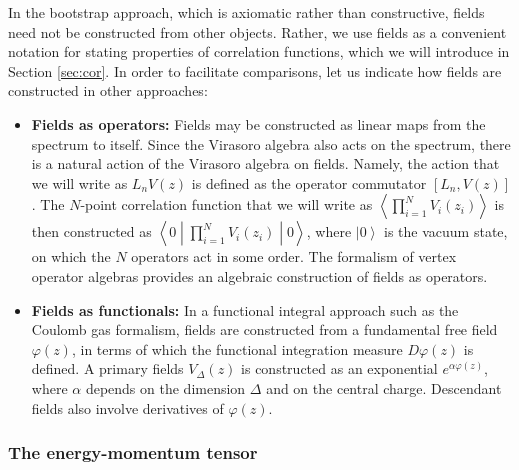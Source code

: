 \documentclass[12pt, a4paper]{article}
\begin{document}
In the bootstrap approach, which is axiomatic rather than constructive, fields need not be constructed from other objects. Rather, we use fields as a convenient notation for stating properties of correlation functions, which we will introduce in Section \ref{sec:cor}. In order to facilitate comparisons, let us indicate how fields are constructed in other approaches:
\begin{itemize}
 \item \textbf{Fields as operators:} Fields may be constructed as linear maps from the spectrum to itself. Since the Virasoro algebra also acts on the spectrum, there is a natural action of the Virasoro algebra on fields. Namely, the action that we will write as $L_nV(z)$ is defined as the operator commutator $[L_n,V(z)]$. The $N$-point correlation function that we will write as $\left<\prod_{i=1}^N V_i(z_i)\right>$ is then constructed as $\left<0\middle| \prod_{i=1}^N V_i(z_i)\middle|0\right>$, where $\left|0\right>$ is the vacuum state, on which the $N$ operators act in some order. The formalism of vertex operator algebras provides an algebraic construction of fields as operators.
 \item \textbf{Fields as functionals:} In a functional integral approach such as the Coulomb gas formalism, fields are constructed from a fundamental free field $\varphi(z)$, in terms of which the functional integration measure $D\varphi(z)$ is defined. A primary fields $V_\Delta(z)$ is constructed as an exponential $e^{\alpha\varphi(z)}$, where $\alpha$ depends on the dimension $\Delta$ and on the central charge. Descendant fields also involve derivatives of $\varphi(z)$.
\end{itemize}



\subsubsection{The energy-momentum tensor}
\end{document}
